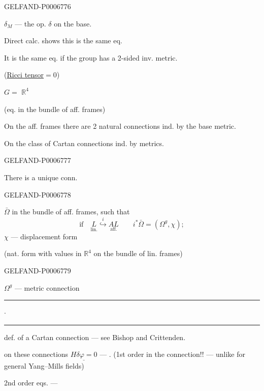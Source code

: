 \begin{GelfandAdjacentEvidence}{GELFAND-P000677}{6}

\(\delta_M\) --- the op. \(\delta\) on the base.

Direct calc. shows this is the same eq.

It is the same eq. if the group has a 2-sided inv. metric.

 (\underline{Ricci tensor}\(=0\))

\(G=\)  \(\mathbb R^4\)

(eq. in the bundle of aff. frames)

On the aff. frames there are 2 natural connections ind. by the base metric.

On the class of Cartan connections ind. by metrics.

\end{GelfandAdjacentEvidence}
\begin{GelfandAdjacentEvidence}{GELFAND-P000677}{7}

There is a unique conn.
\end{GelfandAdjacentEvidence}
\begin{GelfandAdjacentEvidence}{GELFAND-P000677}{8}

\(\bar\Omega\) in the bundle of aff. frames, such that
\[
\text{if}\quad
\underset{\text{lin.}}{L}\overset{i}{\hookrightarrow}
\underset{\text{aff.}}{AL}\qquad
i^*\bar\Omega=(\Omega^g,\chi);
\]
\(\chi\) --- displacement form

(nat. form with values in \(\mathbb R^4\) on the bundle of lin. frames)
\end{GelfandAdjacentEvidence}
\begin{GelfandAdjacentEvidence}{GELFAND-P000677}{9}


\(\Omega^g\) --- metric connection

\noindent\rule{14mm}{.45pt}\enspace\(\cdot\)\enspace\rule{15mm}{.45pt}

def. of a Cartan connection --- see Bishop and Crittenden.

on these connections \(\underline{H\delta\varphi=0}\) --- .
(1st order in the connection!! --- unlike for general Yang–Mills fields)

2nd order eqs. ---
\end{GelfandAdjacentEvidence}

